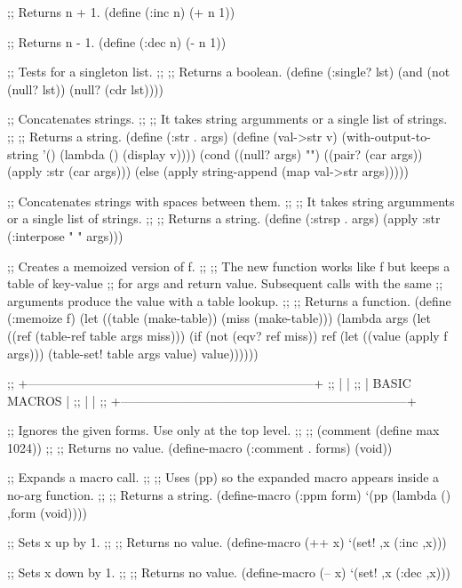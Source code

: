 ;; Returns n + 1.
(define (:inc n) (+ n 1))


;; Returns n - 1.
(define (:dec n) (- n 1))


;; Tests for a singleton list.
;;
;; Returns a boolean.
(define (:single? lst)
  (and (not (null? lst)) (null? (cdr lst))))


;; Concatenates strings.
;;
;; It takes string argumments or a single list of strings.
;;
;; Returns a string.
(define (:str . args)
  (define (val->str v)
    (with-output-to-string '() (lambda () (display v))))
  (cond ((null? args) "")
        ((pair? (car args)) (apply :str (car args)))
        (else (apply string-append (map val->str args)))))


;; Concatenates strings with spaces between them.
;;
;; It takes string argumments or a single list of strings.
;;
;; Returns a string.
(define (:strsp . args)
  (apply :str (:interpose " " args)))


;; Creates a memoized version of f.
;;
;; The new function works like f but keeps a table of key-value 
;; for args and return value. Subsequent calls with the same 
;; arguments produce the value with a table lookup.
;;
;; Returns a function.
(define (:memoize f)
  (let ((table (make-table))
        (miss (make-table)))
    (lambda args
      (let ((ref (table-ref table args miss)))
        (if (not (eqv? ref miss))
          ref
          (let ((value (apply f args)))
            (table-set! table args value)
            value))))))


;; +---------------------------------------------------------------------+
;; |                                                                     |
;; |                          BASIC MACROS                               |
;; |                                                                     |
;; +---------------------------------------------------------------------+


;; Ignores the given forms. Use only at the top level.
;;
;; (comment (define max 1024))
;;
;; Returns no value.
(define-macro (:comment . forms) (void))


;; Expands a macro call.
;;
;; Uses (pp) so the expanded macro appears inside a no-arg function.
;;
;; Returns a string.
(define-macro (:ppm form)
  `(pp (lambda () ,form (void))))


;; Sets x up by 1.
;;
;; Returns no value.
(define-macro (++ x) 
  `(set! ,x (:inc ,x)))


;; Sets x down by 1.
;;
;; Returns no value.
(define-macro (-- x)
  `(set! ,x (:dec ,x)))


